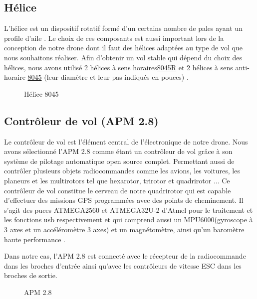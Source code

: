 	\subsection{Hélice}
	L'hélice est un dispositif rotatif formé d’un certains nombre de pales ayant un profile d'aile \cite{aerohesbaye}. Le choix de ces composants est aussi important lors de la conception de notre drone dont il faut des hélices adaptées au type de vol que nous souhaitons réaliser. Afin d'obtenir un vol stable qui dépend du choix des hélices, nous avons utilisé 2 hélices à sens horaires\underline{8045R} et 2 hélices à sens anti-horaire \underline{8045} (leur diamètre et leur pas indiqués en pouces) \cite{FPV24}.
	\begin{figure} [H]
		\begin{center}
			\centering
		\end{center}
		\caption{Hélice 8045}
	\end{figure}
	\subsection {Contrôleur de vol (APM 2.8)}
	Le contrôleur de vol est l'élément central de l'électronique de notre drone.
	Nous avons sélectionné l'APM 2.8 comme étant un contrôleur de vol grâce à son système de pilotage automatique open source complet. Permettant aussi de contrôler plusieurs objets radiocommandes comme les avions, les voitures, les planeurs et les multirotors tel que hexarotor, trirotor et quadrirotor ...
	Ce contrôleur de vol constitue le cerveau de notre quadrirotor qui est capable d'effectuer des missions GPS programmées avec des points de cheminement. Il s'agit des puces ATMEGA2560 et ATMEGA32U-2 d'Atmel pour le traitement et les fonctions usb respectivement et qui comprend aussi un MPU6000(gyroscope à 3 axes et un accéléromètre 3 axes)  et un magnétomètre, ainsi qu'un baromètre haute performance \cite{abraelectronics}.
	
	Dans notre cas, l'APM 2.8 est connecté avec le récepteur de la radiocommande dans les broches d’entrée ainsi qu'avec les contrôleurs de vitesse ESC dans les broches de sortie. 
	
	\begin{figure} [H]
		\begin{center}
			\centering
		\end{center}
		\caption{APM 2.8}
	\end{figure}
	
